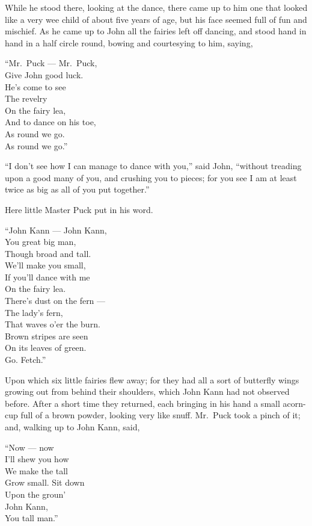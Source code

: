 \documentclass[
  12pt,
  a5paper,
  twoside]{book}
\begin{document}
While he stood there, looking at the dance, there came up to him one
that looked like a very wee child of about five years of age, but his
face seemed full of fun and mischief. As he came up to John all the
fairies left off dancing, and stood hand in hand in a half circle round,
bowing and courtesying to him, saying,

``Mr.~Puck --- Mr.~Puck,\\
Give John good luck.\\
He's come to see\\
The revelry\\
On the fairy lea,\\
And to dance on his toe,\\
As round we go.\\
As round we go.''

``I don't see how I can manage to dance with you,'' said John, ``without
treading upon a good many of you, and crushing you to pieces; for you
see I am at least twice as big as all of you put together.''

Here little Master Puck put in his word.

``John Kann --- John Kann,\\
You great big man,\\
Though broad and tall.\\
We'll make you small,\\
If you'll dance with me\\
On the fairy lea.\\
There's dust on the fern ---\\
The lady's fern,\\
That waves o'er the burn.\\
Brown stripes are seen\\
On its leaves of green.\\
Go. Fetch.''

Upon which six little fairies flew away; for they had all a sort of
butterfly wings growing out from behind their shoulders, which John Kann
had not observed before. After a short time they returned, each bringing
in his hand a small acorn-cup full of a brown powder, looking very like
snuff. Mr.~Puck took a pinch of it; and, walking up to John Kann, said,

``Now --- now\\
I'll shew you how\\
We make the tall\\
Grow small. Sit down\\
Upon the groun'\\
John Kann,\\
You tall man.''
\end{document}
